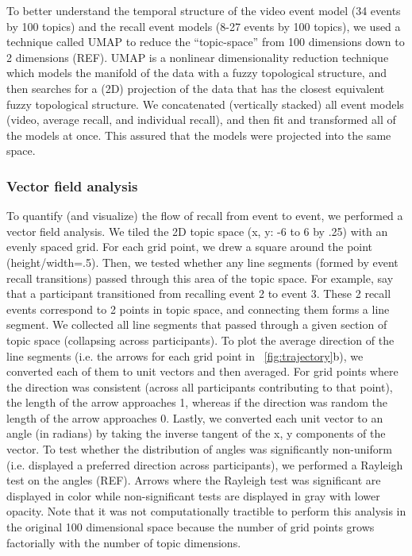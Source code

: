 \documentclass{article}
\begin{document}
{To better understand the temporal structure of the video event model (34 events by 100 topics) and the recall event models (8-27 events by 100 topics), we used a technique called UMAP to reduce the ``topic-space'' from 100 dimensions down to 2 dimensions (REF). UMAP is a nonlinear dimensionality reduction technique which models the manifold of the data with a fuzzy topological structure, and then searches for a (2D) projection of the data that has the closest equivalent fuzzy topological structure. We concatenated (vertically stacked) all event models (video, average recall, and individual recall), and then fit and transformed all of the models at once. This assured that the models were projected into the same space.

\subsubsection{Vector field analysis}
To quantify (and visualize) the flow of recall from event to event, we performed a vector field analysis.  We tiled the 2D topic space (x, y: -6 to 6 by .25) with an evenly spaced grid. For each grid point, we drew a square around the point (height/width=.5). Then, we tested whether any line segments (formed by event recall transitions) passed through this area of the topic space.  For example, say that a participant transitioned from recalling event 2 to event 3. These 2 recall events correspond to 2 points in topic space, and connecting them forms a line segment. We collected all line segments that passed through a given section of topic space (collapsing across participants). To plot the average direction of the line segments (i.e. the arrows for each grid point in ~\ref{fig:trajectory}b), we converted each of them to unit vectors and then averaged. For grid points where the direction was consistent (across all participants contributing to that point), the length of the arrow approaches 1, whereas if the direction was random the length of the arrow approaches 0. Lastly, we converted each unit vector to an angle (in radians) by taking the inverse tangent of the x, y components of the vector. To test whether the distribution of angles was significantly non-uniform (i.e. displayed a preferred direction across participants), we performed a Rayleigh test on the angles (REF). Arrows where the Rayleigh test was significant are displayed in color while non-significant tests are displayed in gray with lower opacity. Note that it was not computationally tractible to perform this analysis in the original 100 dimensional space because the number of grid points grows factorially with the number of topic dimensions.

}
\end{document}
